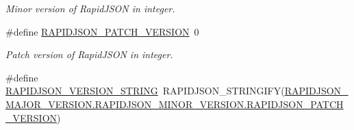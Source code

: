 \begin{DoxyCompactItemize}
\begin{DoxyCompactList}\small\item\em Minor version of Rapid\+J\+S\+ON in integer. \end{DoxyCompactList}\item 
\#define \hyperlink{group___r_a_p_i_d_j_s_o_n___c_o_n_f_i_g_gaf967d31be43666ce7f53756d73bd1cdf}{R\+A\+P\+I\+D\+J\+S\+O\+N\+\_\+\+P\+A\+T\+C\+H\+\_\+\+V\+E\+R\+S\+I\+ON}~0\hypertarget{group___r_a_p_i_d_j_s_o_n___c_o_n_f_i_g_gaf967d31be43666ce7f53756d73bd1cdf}{}\label{group___r_a_p_i_d_j_s_o_n___c_o_n_f_i_g_gaf967d31be43666ce7f53756d73bd1cdf}

\begin{DoxyCompactList}\small\item\em Patch version of Rapid\+J\+S\+ON in integer. \end{DoxyCompactList}\item 
\#define \hyperlink{group___r_a_p_i_d_j_s_o_n___c_o_n_f_i_g_gad283cfde97d9a32b7d8e8107b11f70a6}{R\+A\+P\+I\+D\+J\+S\+O\+N\+\_\+\+V\+E\+R\+S\+I\+O\+N\+\_\+\+S\+T\+R\+I\+NG}~R\+A\+P\+I\+D\+J\+S\+O\+N\+\_\+\+S\+T\+R\+I\+N\+G\+I\+FY(\hyperlink{group___r_a_p_i_d_j_s_o_n___c_o_n_f_i_g_gaf967d31be43666ce7f53756d73bd1cdf}{R\+A\+P\+I\+D\+J\+S\+O\+N\+\_\+\+M\+A\+J\+O\+R\+\_\+\+V\+E\+R\+S\+I\+O\+N.\+R\+A\+P\+I\+D\+J\+S\+O\+N\+\_\+\+M\+I\+N\+O\+R\+\_\+\+V\+E\+R\+S\+I\+O\+N.\+R\+A\+P\+I\+D\+J\+S\+O\+N\+\_\+\+P\+A\+T\+C\+H\+\_\+\+V\+E\+R\+S\+I\+ON})\hypertarget{group___r_a_p_i_d_j_s_o_n___c_o_n_f_i_g_gad283cfde97d9a32b7d8e8107b11f70a6}{}\label{group___r_a_p_i_d_j_s_o_n___c_o_n_f_i_g_gad283cfde97d9a32b7d8e8107b11f70a6}


\end{DoxyCompactItemize}
